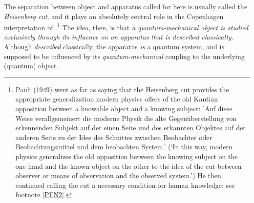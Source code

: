 \documentclass[12pt]{article}
\begin{document}
The separation between object and apparatus called for here is
usually called the \textit{Heisenberg cut}, and it  plays an absolutely central role in the Copenhagen interpretation of \qm.\footnote{Pauli (1949) went  as far as saying that the Heisenberg cut provides the appropriate generalization modern physics offers of the old Kantian opposition between a knowable object and a knowing subject: 'Auf diese Weise verallgemeinert die moderne Physik die alte Gegen\"{u}berstellung von erkennenden Subjekt auf der einen Seite und des erkannten Objektes auf der anderen Seite zu der Idee des Schnittes zwischen Beobachter oder Beobachtungsmittel und dem beobachten System.'
(`In this way, modern physics generalizes the old opposition between the knowing subject on the one hand and the known object on the other to the idea
of the cut between observer or means of observation and the observed system.')  He then continued  calling the cut a necessary condition for human knowledge: see footnote \ref{PFN2}. } 
The idea, then, is that {\it a quantum-mechanical object is studied exclusively through its influence on an apparatus that is described classically}. Although {\it described} classically, the apparatus {\it is} a quantum system, and is supposed to be  influenced by its {\it quantum-mechanical} coupling to the underlying (quantum) object.
\end{document}

